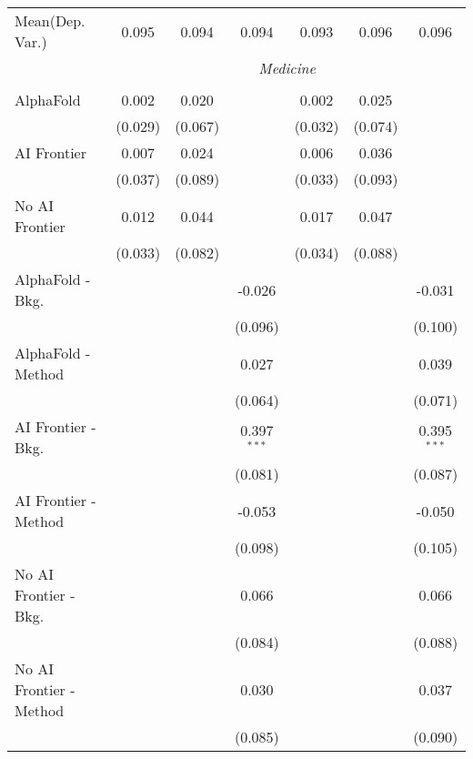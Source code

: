 \begin{tabular}{lcccccc}
Mean(Dep. Var.) & 0.095 & 0.094 & 0.094 & 0.093 & 0.096 & 0.096 \\
 & \multicolumn{6}{c}{\textit{Medicine}} \\ \\
   AlphaFold               & 0.002   & 0.020   &               & 0.002   & 0.025   &   \\   
                           & (0.029) & (0.067) &               & (0.032) & (0.074) &   \\   
   AI Frontier             & 0.007   & 0.024   &               & 0.006   & 0.036   &   \\   
                           & (0.037) & (0.089) &               & (0.033) & (0.093) &   \\   
   No AI Frontier          & 0.012   & 0.044   &               & 0.017   & 0.047   &   \\   
                           & (0.033) & (0.082) &               & (0.034) & (0.088) &   \\   
   AlphaFold - Bkg.        &         &         & -0.026        &         &         & -0.031\\   
                           &         &         & (0.096)       &         &         & (0.100)\\   
   AlphaFold - Method      &         &         & 0.027         &         &         & 0.039\\   
                           &         &         & (0.064)       &         &         & (0.071)\\   
   AI Frontier - Bkg.      &         &         & 0.397$^{***}$ &         &         & 0.395$^{***}$\\   
                           &         &         & (0.081)       &         &         & (0.087)\\   
   AI Frontier - Method    &         &         & -0.053        &         &         & -0.050\\   
                           &         &         & (0.098)       &         &         & (0.105)\\   
   No AI Frontier - Bkg.   &         &         & 0.066         &         &         & 0.066\\   
                           &         &         & (0.084)       &         &         & (0.088)\\   
   No AI Frontier - Method &         &         & 0.030         &         &         & 0.037\\   
                           &         &         & (0.085)       &         &         & (0.090)\\   

\end{tabular}
